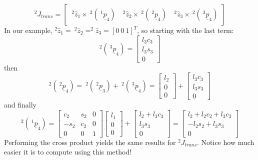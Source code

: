 \documentclass[]{article}
\begin{document}
\begin{displaymath}
^{2}J_{trans} = \left[ \begin{array}{ccc} \ \!^{2}\hat{z}_{1} \times \ \!^{2}(\ \!^{1}\underline{p}_{4}) & \ \!^{2}\hat{z}_{2} \times \ \!^{2}(\ \!^{2}\underline{p}_{4}) & \ \!^{2}\hat{z}_{3} \times \ \!^{2}(\ \!^{3}\underline{p}_{4})\end{array}\right]
\end{displaymath}
In our example, $^{2}\hat{z}_{1} = \ \!^{2}\hat{z}_{2} = ^{2}\hat{z}_{3} = [0\ 0\ 1]^{T}$, so starting with the last term:
\begin{displaymath}
^{2}(\ \!^{3}\underline{p}_{4}) = \left[ \begin{array}{c} l_{3}c_{3} \\ l_{3}s_{3} \\ 0 \end{array}\right]
\end{displaymath}
then
\begin{displaymath}
^{2}(\ \!^{2}\underline{p}_{4}) = \ \!^{2}(\ \!^{2}\underline{p}_{3}) + \ \!^{2}(\ \!^{3}\underline{p}_{4}) = \left[ \begin{array}{c} l_{2} \\ 0 \\ 0 \end{array} \right] + \left[ \begin{array}{c} l_{3}c_{3} \\ l_{3}s_{3} \\ 0 \end{array}\right]
\end{displaymath}
and finally
\begin{displaymath}
^{2}(\ \!^{1}\underline{p}_{4}) = \left[\begin{array}{ccc}c_{2} & s_{2} & 0 \\ -s_{2} & c_{2} & 0 \\ 0 & 0 & 1 \end{array}\right]\left[\begin{array}{c} l_{1} \\ 0 \\ 0 \end{array}\right] + \left[\begin{array}{c} l_{2} + l_{3}c_{3} \\ l_{3}s_{3} \\ 0 \end{array} \right] = \left[\begin{array}{c} l_{2}+l_{2}c_{2}+l_{3}c_{3} \\ -l_{2}s_{2} + l_{3}s_{3} \\ 0 \end{array}\right]
\end{displaymath}
Performing the cross product yields the same results for $^{2}J_{trans}$. Notice how much easier it is to compute using this method!
\end{document}
